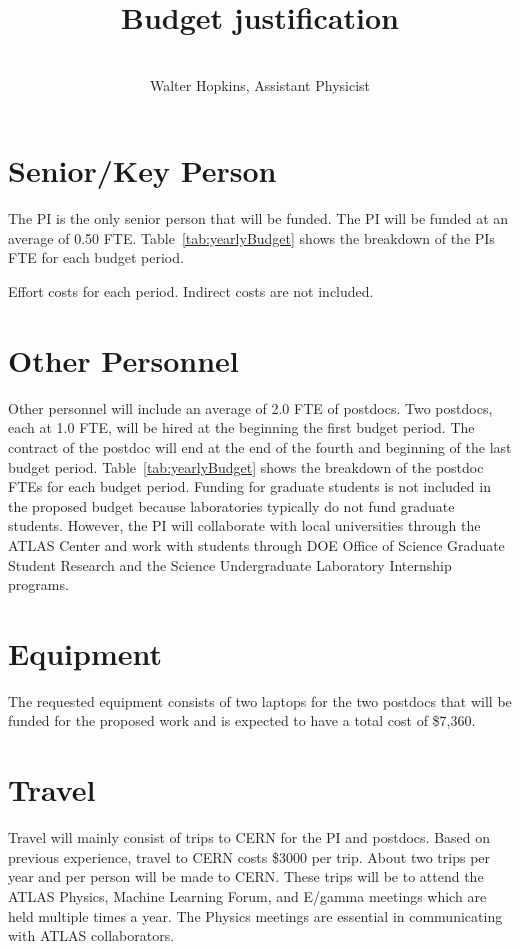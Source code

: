 \documentclass[letter, USenglish, 11pt, subfigure]{article}
\title{Budget justification}
\author{\\ Walter Hopkins, Assistant Physicist\\
}
\date{}
\begin{document}
\maketitle
\thispagestyle{firststyle}

\section{Senior/Key Person}
\label{subsec:keyPerson}
The PI is the only senior person that will be funded. The PI will be funded at an average of 0.50 FTE. Table~\ref{tab:yearlyBudget} shows the breakdown of the PIs FTE for each budget period.

\begin{table}[!htpb]
  \begin{center}
    \caption{Effort costs for each period. Indirect costs are not included.}
      \label{tab:yearlyBudget}
  
  \end{center}
\end{table}

\section{Other Personnel}
\label{subsec:personnel}
Other personnel will include an average of 2.0 FTE of postdocs. Two postdocs, each at 1.0 FTE, will be hired at the beginning the first budget period. The contract of the postdoc will end at the end of the fourth and beginning of the last budget period. Table~\ref{tab:yearlyBudget} shows the breakdown of the postdoc FTEs for each budget period. Funding for graduate students is not included in the proposed budget because laboratories typically do not fund graduate students. However, the PI will collaborate with local universities through the ATLAS Center and work with students through DOE Office of Science Graduate Student Research and the Science Undergraduate Laboratory Internship programs.

\clearpage
\section{Equipment}
\label{subsec:Equipment}
The requested equipment consists of two laptops for the two postdocs that will be funded for the proposed work and is expected to have a total cost of \$7,360. 

\section{Travel}
\label{subsec:travel}
Travel will mainly consist of trips to CERN for the PI and postdocs. Based on previous experience, travel to CERN costs \$3000 per trip. About two trips per year and per person will be made to CERN. These trips will be to attend the ATLAS Physics, Machine Learning Forum, and E/gamma meetings which are held multiple times a year. The Physics meetings are essential in communicating with ATLAS collaborators.
\end{document}
